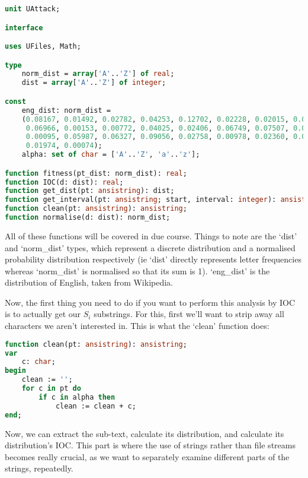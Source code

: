 \documentclass[fleqn,a4paper,11pt]{article}
\begin{document}
\begin{lstlisting}[language=Pascal, caption=UAttack interface]
unit UAttack;

interface

uses UFiles, Math;

type
    norm_dist = array['A'..'Z'] of real;
    dist = array['A'..'Z'] of integer;

const
    eng_dist: norm_dist =
    (0.08167, 0.01492, 0.02782, 0.04253, 0.12702, 0.02228, 0.02015, 0.06094,
     0.06966, 0.00153, 0.00772, 0.04025, 0.02406, 0.06749, 0.07507, 0.01929,
     0.00095, 0.05987, 0.06327, 0.09056, 0.02758, 0.00978, 0.02360, 0.00150,
     0.01974, 0.00074);
    alpha: set of char = ['A'..'Z', 'a'..'z'];

function fitness(pt_dist: norm_dist): real;
function IOC(d: dist): real;
function get_dist(pt: ansistring): dist;
function get_interval(pt: ansistring; start, interval: integer): ansistring;
function clean(pt: ansistring): ansistring;
function normalise(d: dist): norm_dist;
\end{lstlisting}

    All of these functions will be covered in due course. Things to note are
    the `dist' and `norm\_dist' types, which represent a discrete distribution
    and a normalised probability distribution respectively (ie `dist' directly
    represents letter frequencies whereas `norm\_dist' is normalised so that
    its sum is 1). `eng\_dist' is the distribution of English, taken from
    Wikipedia.

    Now, the first thing you need to do if you want to perform this analysis by
    IOC is to actually get our \(S_i\) substrings. For this, first we'll want to
    strip away all characters we aren't interested in. This is what the `clean'
    function does:

\begin{lstlisting}[language=Pascal, caption=Clean function]
function clean(pt: ansistring): ansistring;
var
    c: char;
begin
    clean := '';
    for c in pt do
        if c in alpha then
            clean := clean + c;
end;
\end{lstlisting}

    Now, we can extract the sub-text, calculate its distribution, and calculate
    its distribution's IOC. This part is where the use of strings rather than
    file streams becomes really crucial, as we want to separately examine
    different parts of the strings, repeatedly.
\end{document}
